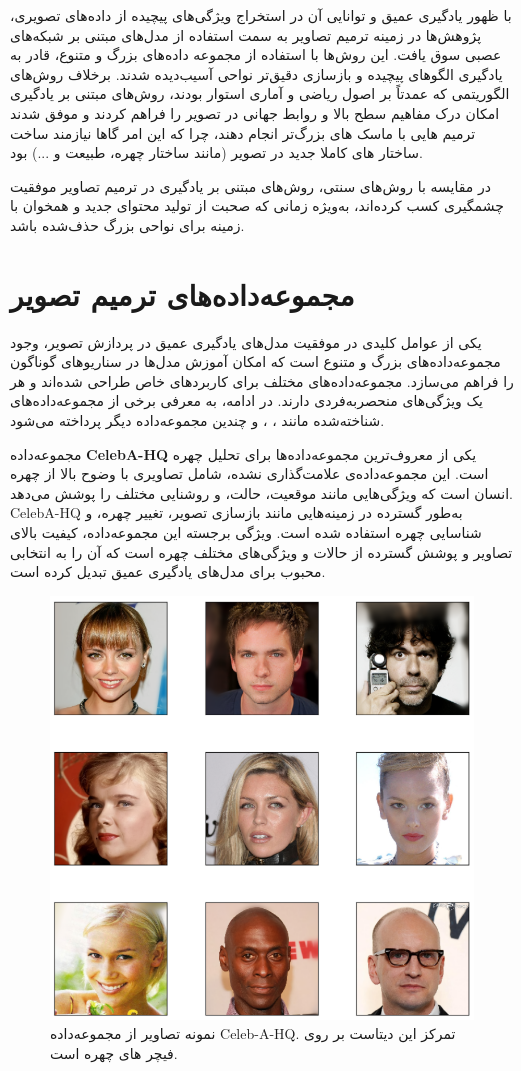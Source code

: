 با ظهور یادگیری عمیق و توانایی آن در استخراج ویژگی‌های پیچیده از داده‌های تصویری، پژوهش‌ها در زمینه ترمیم تصاویر به سمت استفاده از مدل‌های مبتنی بر شبکه‌های عصبی سوق یافت. این روش‌ها با استفاده از مجموعه داده‌های بزرگ و متنوع، قادر به یادگیری الگوهای پیچیده و بازسازی دقیق‌تر نواحی آسیب‌دیده شدند. برخلاف روش‌های الگوریتمی که عمدتاً بر اصول ریاضی و آماری استوار بودند، روش‌های مبتنی بر یادگیری امکان درک مفاهیم سطح بالا و روابط جهانی در تصویر را فراهم کردند و موفق شدند ترمیم هایی با  ماسک های بزرگ‌تر انجام دهند، چرا که این امر گاها نیازمند ساخت ساختار های کاملا جدید در تصویر (مانند ساختار چهره، طبیعت و ...) بود.

در مقایسه با روش‌های سنتی، روش‌های مبتنی بر یادگیری در ترمیم تصاویر موفقیت چشمگیری کسب کرده‌اند، به‌ویژه زمانی که صحبت از تولید محتوای جدید و همخوان با زمینه برای نواحی بزرگ حذف‌شده باشد.

\section{مجموعه‌داده‌های ترمیم تصویر}

یکی از عوامل کلیدی در موفقیت مدل‌های یادگیری عمیق در پردازش تصویر، وجود مجموعه‌داده‌های بزرگ و متنوع است که امکان آموزش مدل‌ها در سناریوهای گوناگون را فراهم می‌سازد. مجموعه‌داده‌های مختلف برای کاربردهای خاص طراحی شده‌اند و هر یک ویژگی‌های منحصربه‌فردی دارند. در ادامه، به معرفی برخی از مجموعه‌داده‌های شناخته‌شده مانند ، ، و چندین مجموعه‌داده دیگر پرداخته می‌شود.


مجموعه‌داده \textbf{CelebA-HQ} یکی از معروف‌ترین مجموعه‌داده‌ها برای تحلیل چهره است. این مجموعه‌داده‌ی علامت‌گذاری نشده، شامل تصاویری با وضوح بالا از چهره انسان است که ویژگی‌هایی مانند موقعیت، حالت، و روشنایی مختلف را پوشش می‌دهد. CelebA-HQ به‌طور گسترده در زمینه‌هایی مانند بازسازی تصویر، تغییر چهره، و شناسایی چهره استفاده شده است. ویژگی برجسته این مجموعه‌داده، کیفیت بالای تصاویر و پوشش گسترده از حالات و ویژگی‌های مختلف چهره است که آن را به انتخابی محبوب برای مدل‌های یادگیری عمیق تبدیل کرده است.

\begin{figure}
	\centering
	\includegraphics[width=0.7\linewidth]{celebahq1}
	\caption{نمونه تصاویر از مجموعه‌داده Celeb-A-HQ. تمرکز این دیتاست بر روی فیچر های چهره است.}
	\label{fig:celebahq1}
\end{figure}

